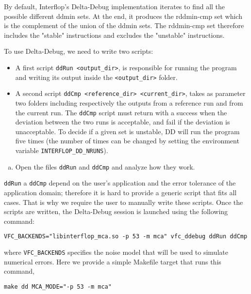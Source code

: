 By default, Interflop's Delta-Debug implementation iterates to find all the
possible different ddmin sets. At the end, it produces the rddmin-cmp set which
is the complement of the union of the ddmin sets. The rddmin-cmp set therefore
includes the "stable" instructions and excludes the "unstable" instructions.

To use Delta-Debug, we need to write two scripts: \begin{itemize}
  \item A first script \texttt{ddRun <output\_dir>}, is responsible for running the program and writing its output inside the \texttt{<output\_dir>} folder.
  \item A second script \texttt{ddCmp <reference\_dir> <current\_dir>}, takes as parameter two folders including respectively the outputs from a reference run and from the current run. The \texttt{ddCmp} script must return with a success when the deviation between the two runs is acceptable, and fail if the deviation is unacceptable.
    To decide if a given set is unstable, DD will run the program five times (the number of times can be changed by setting the environment variable \texttt{INTERFLOP\_DD\_NRUNS}).
\end{itemize}

\begin{question}
  \begin{enumerate}[(a)]
    \item Open the files \texttt{ddRun} and \texttt{ddCmp} and analyze how they work.
  \end{enumerate}
\end{question}

\texttt{ddRun} a \texttt{ddCmp} depend on the user's application and the error tolerance
of the application domain; therefore it is hard to provide a generic script that fits all cases. That is why we require the user to manually write these scripts.
Once the scripts are written, the Delta-Debug session is launched using the following command:

\begin{verbatim}
VFC_BACKENDS="libinterflop_mca.so -p 53 -m mca" vfc_ddebug ddRun ddCmp
\end{verbatim}

where \texttt{VFC\_BACKENDS} specifies the noise model that will be used to
simulate numerical errors. Here we provide a simple Makefile target that
runs this command,
\begin{verbatim}
make dd MCA_MODE="-p 53 -m mca"
\end{verbatim}

